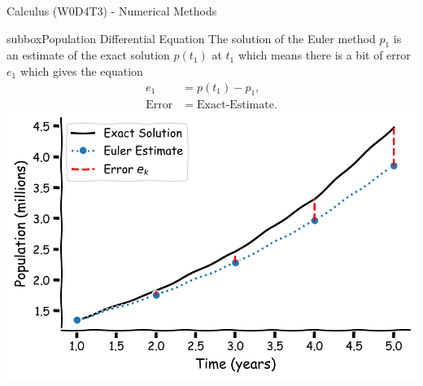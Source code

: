 \begin{textbox}{Calculus (W0D4T3) - Numerical Methods}
\begin{subbox}{subbox}{Population Differential Equation}
The solution of the Euler method $p_1$ is an estimate of the exact solution $p(t_1)$ at $t_1$ which means there is a bit of error $e_1$ which gives the equation
\begin{align*}
e_1&=p(t_1)-p_1,\\
\text{Error}&=\text{Exact-Estimate}.
\end{align*}
\centering
\includegraphics[scale=0.12]{Figures/PreCourse/CFigure7.png}
\end{subbox}

\end{textbox}

